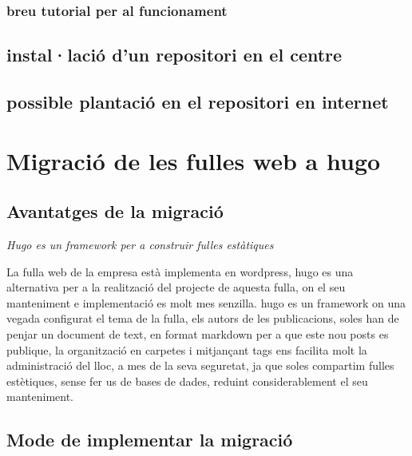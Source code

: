 \documentclass[
  10pt,
]{book}
\begin{document}
\hypertarget{breu-tutorial-per-al-funcionament}{%
\subsection{breu tutorial per al funcionament}\label{breu-tutorial-per-al-funcionament}}

\hypertarget{installaciuxf3-dun-repositori-en-el-centre}{%
\section{instal·lació d'un repositori en el centre}\label{installaciuxf3-dun-repositori-en-el-centre}}

\hypertarget{possible-plantaciuxf3-en-el-repositori-en-internet}{%
\section{possible plantació en el repositori en internet}\label{possible-plantaciuxf3-en-el-repositori-en-internet}}

\hypertarget{migraciuxf3-de-les-fulles-web-a-hugo}{%
\chapter{Migració de les fulles web a hugo}\label{migraciuxf3-de-les-fulles-web-a-hugo}}

\hypertarget{avantatges-de-la-migraciuxf3}{%
\section{Avantatges de la migració}\label{avantatges-de-la-migraciuxf3}}

\emph{Hugo es un framework per a construir fulles estàtiques}

La fulla web de la empresa està implementa en wordpress, hugo es una alternativa per a la realització del projecte de aquesta fulla, on el seu manteniment e implementació es molt mes senzilla. hugo es un framework on una vegada configurat el tema de la fulla, els autors de les publicacions, soles han de penjar un document de text, en format markdown per a que este nou posts es publique, la organització en carpetes i mitjançant tags ens facilita molt la administració del lloc, a mes de la seva seguretat, ja que soles compartim fulles estètiques, sense fer us de bases de dades, reduint considerablement el seu manteniment.

\hypertarget{mode-de-implementar-la-migraciuxf3}{%
\section{Mode de implementar la migració}\label{mode-de-implementar-la-migraciuxf3}}
\end{document}
